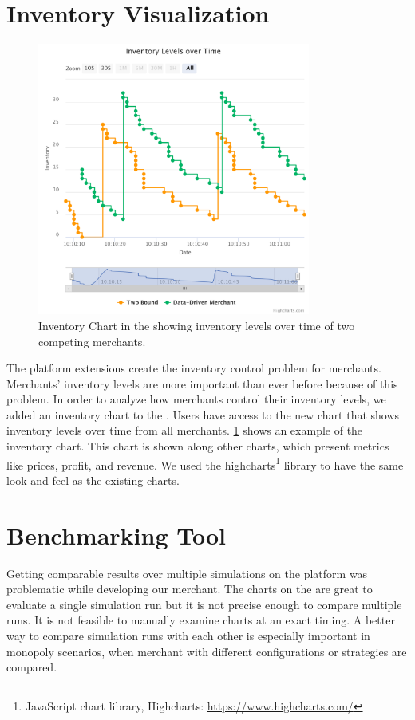 \section{Inventory Visualization}
\label{section:inventory_graph}

\begin{figure}[t]
	\centering
	\includegraphics[width=0.8\textwidth]{figures/inventory_graph}
	\caption[Inventory Chart on the \UI]{Inventory Chart in the \ui showing inventory levels over time of two competing merchants.}
	\label{fig:invnetory_graph}
\end{figure}

The platform extensions create the inventory control problem for merchants.
Merchants' inventory levels are more important than ever before because of this problem.
In order to analyze how merchants control their inventory levels, we added an inventory chart to the \ui.
Users have access to the new chart that shows inventory levels over time from all merchants.
\cref{fig:invnetory_graph} shows an example of the inventory chart.
This chart is shown along other charts, which present metrics like prices, profit, and revenue. 
We used the highcharts\footnote{JavaScript chart library, Highcharts: \url{https://www.highcharts.com/}} library to have the same look and feel as the existing charts.

\section{Benchmarking Tool}
\label{section:benchmark_tool}
Getting comparable results over multiple simulations on the \pricewars platform was problematic while developing our merchant.
The charts on the \ui are great to evaluate a single simulation run but it is not precise enough to compare multiple runs.
It is not feasible to manually examine charts at an exact timing.
A better way to compare simulation runs with each other is especially important in monopoly scenarios, when merchant with different configurations or strategies are compared.

